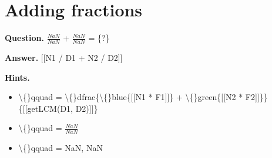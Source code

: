 \documentclass{article}
\begin{document}
\section*{Adding fractions}
\textbf{Question.} $\frac{NaN}{NaN}$ + $\frac{NaN}{NaN}$ = \{?\}

\textbf{Answer.} [[N1 / D1 + N2 / D2]]

\textbf{Hints.}
\begin{itemize}
  \item \textbackslash\{\}qquad = \textbackslash\{\}dfrac\{\textbackslash\{\}blue\{[[N1 * F1]]\} + 
                            \textbackslash\{\}green\{[[N2 * F2]]\}\}\{[[getLCM(D1, D2)]]\}
  \item \textbackslash\{\}qquad = $\frac{NaN}{NaN}$
  \item \textbackslash\{\}qquad = NaN, NaN
\end{itemize}
\end{document}
